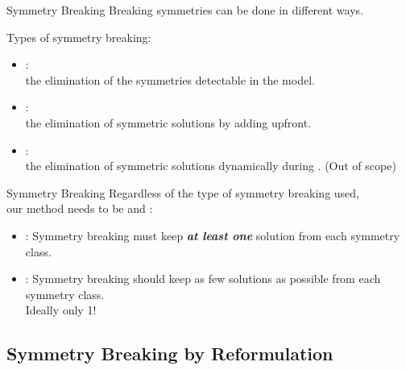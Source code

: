 \documentclass{cons-beamer}
\begin{document}
\begin{frame}{Symmetry Breaking}
  Breaking symmetries can be done in different ways.
  \vfill

  Types of symmetry breaking:
  \begin{itemize}
    \item {}: \\ the
      elimination of the symmetries detectable in the model.
    \item {}: \\ the elimination of
      symmetric solutions by adding  upfront.
    \item {}: \\ the elimination of
      symmetric solutions dynamically during . (Out of scope)
  \end{itemize}
\end{frame}

\begin{frame}{Symmetry Breaking}
  Regardless of the type of symmetry breaking used, \\ our method needs to be  and :
  \vfill

  \begin{itemize}
    \item {}: Symmetry breaking must keep \textbf{\textit{at least one}} solution from each symmetry class.
      \vfill 

    \item {}: Symmetry breaking should keep as few solutions as possible from each symmetry class. \\
    \alert{Ideally only 1!}
  \end{itemize}
\end{frame}


\subsection{Symmetry Breaking by Reformulation}
\end{document}

